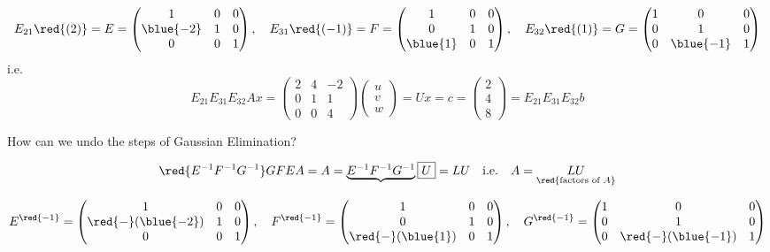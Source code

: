 \[
E_{21}\red{(2)} = E = \begin{pmatrix}
    1 & 0 & 0 \\
    \blue{-2} & 1 & 0 \\
    0 & 0 & 1
\end{pmatrix}, \quad E_{31}\red{(-1)} = F = \begin{pmatrix}
    1 & 0 & 0 \\
    0 & 1 & 0 \\
    \blue{1} & 0 & 1
\end{pmatrix}, \quad E_{32}\red{(1)} = G = \begin{pmatrix}
    1 & 0 & 0 \\
    0 & 1 & 0 \\
    0 & \blue{-1} & 1
\end{pmatrix}
\]
i.e. \[
E_{21}E_{31}E_{32}Ax = \begin{pmatrix}
    2 & 4 & -2 \\
    0 & 1 & 1 \\
    0 & 0 & 4
\end{pmatrix} \begin{pmatrix}
    u \\ v \\ w
\end{pmatrix} = Ux = c = \begin{pmatrix}
    2 \\ 4 \\ 8
\end{pmatrix} = E_{21}E_{31}E_{32}b
\]

\begin{exercise}
How can we undo the steps of Gaussian Elimination?
\end{exercise}

\[
\red{E^{-1}F^{-1}G^{-1}}GFEA = A = \underbrace{E^{-1}F^{-1}G^{-1}}\boxed{U} = LU \quad \text{i.e.} \quad A=\underset{\red{\text{factors of }A}}{LU}
\]

\[
E^{\red{-1}} = \begin{pmatrix}
    1 & 0 & 0 \\
    \red{-}(\blue{-2}) & 1 & 0 \\
    0 & 0 & 1
\end{pmatrix}, \quad F^{\red{-1}} = \begin{pmatrix}
    1 & 0 & 0 \\
    0 & 1 & 0 \\
    \red{-}(\blue{1}) & 0 & 1
\end{pmatrix}, \quad G^{\red{-1}} = \begin{pmatrix}
    1 & 0 & 0 \\
    0 & 1 & 0 \\
    0 & \red{-}(\blue{-1}) & 1
\end{pmatrix}
\]

